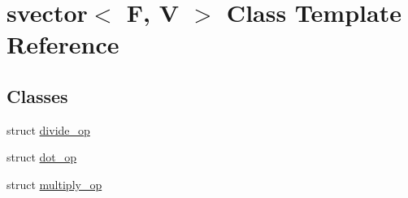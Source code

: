 \hypertarget{classsvector}{
\section{svector$<$ F, V $>$ Class Template Reference}
\label{classsvector}
}
\subsection*{Classes}
\begin{DoxyCompactItemize}
\item 
struct \hyperlink{structsvector_1_1divide__op}{divide\_\-op}
\item 
struct \hyperlink{structsvector_1_1dot__op}{dot\_\-op}
\item 
struct \hyperlink{structsvector_1_1multiply__op}{multiply\_\-op}
\end{DoxyCompactItemize}
